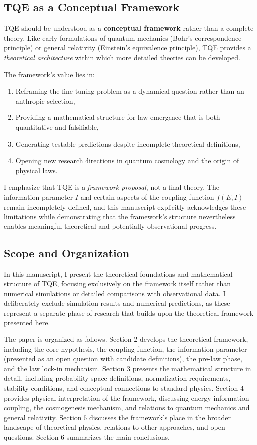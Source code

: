 \documentclass[12pt,a4paper]{article}
\theoremstyle{definition}
\theoremstyle{remark}
\begin{document}
\subsection{TQE as a Conceptual Framework}

TQE should be understood as a \textbf{conceptual framework} rather than a complete theory. Like early formulations of quantum mechanics (Bohr's correspondence principle) or general relativity (Einstein's equivalence principle), TQE provides a \textit{theoretical architecture} within which more detailed theories can be developed.

The framework's value lies in:
\begin{enumerate}
\item Reframing the fine-tuning problem as a dynamical question rather than an anthropic selection,
\item Providing a mathematical structure for law emergence that is both quantitative and falsifiable,
\item Generating testable predictions despite incomplete theoretical definitions,
\item Opening new research directions in quantum cosmology and the origin of physical laws.
\end{enumerate}

I emphasize that TQE is a \emph{framework proposal}, not a final theory. The information parameter $I$ and certain aspects of the coupling function $f(E,I)$ remain incompletely defined, and this manuscript explicitly acknowledges these limitations while demonstrating that the framework's structure nevertheless enables meaningful theoretical and potentially observational progress.

\subsection{Scope and Organization}

In this manuscript, I present the theoretical foundations and mathematical structure of TQE, focusing exclusively on the framework itself rather than numerical simulations or detailed comparisons with observational data. I deliberately exclude simulation results and numerical predictions, as these represent a separate phase of research that builds upon the theoretical framework presented here.

The paper is organized as follows. Section 2 develops the theoretical framework, including the core hypothesis, the coupling function, the information parameter (presented as an open question with candidate definitions), the pre-law phase, and the law lock-in mechanism. Section 3 presents the mathematical structure in detail, including probability space definitions, normalization requirements, stability conditions, and conceptual connections to standard physics. Section 4 provides physical interpretation of the framework, discussing energy-information coupling, the cosmogenesis mechanism, and relations to quantum mechanics and general relativity. Section 5 discusses the framework's place in the broader landscape of theoretical physics, relations to other approaches, and open questions. Section 6 summarizes the main conclusions.
\end{document}

